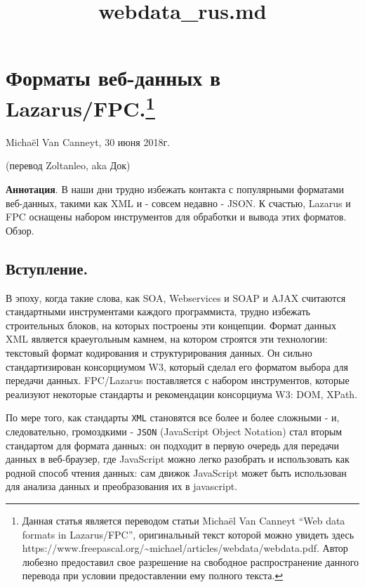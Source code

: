 \documentclass[
]{article}
\title{webdata\_rus.md}
\author{}
\date{}
\begin{document}
\maketitle

\hypertarget{header-n2623}{%
\section[Форматы веб-данных в Lazarus/FPC.]{\texorpdfstring{Форматы
веб-данных в
Lazarus/FPC.\footnote{Данная статья является переводом статьи Michaël
  Van Canneyt ``Web data formats in Lazarus/FPC'', оригинальный текст
  которой можно увидеть здесь
  https://www.freepascal.org/\textasciitilde michael/articles/webdata/webdata.pdf.
  Автор любезно предоставил свое разрешение на свободное распространение
  данного перевода при условии предоставлении ему полного текста.}}{Форматы веб-данных в Lazarus/FPC.}}\label{header-n2623}}

Michaël Van Canneyt, 30 июня 2018г.

(перевод Zoltanleo, aka Док)

\textbf{Аннотация}. В наши дни трудно избежать контакта с популярными
форматами веб-данных, такими как XML и - совсем недавно - JSON. К
счастью, Lazarus и FPC оснащены набором инструментов для обработки и
вывода этих форматов. Обзор.

\hypertarget{header-n2416}{%
\subsection{Вступление.}\label{header-n2416}}

В эпоху, когда такие слова, как SOA, Webservices и SOAP и AJAX считаются
стандартными инструментами каждого программиста, трудно избежать
строительных блоков, на которых построены эти концепции. Формат данных
XML является краеугольным камнем, на котором строятся эти технологии:
текстовый формат кодирования и структурирования данных. Он сильно
стандартизирован консорциумом W3, который сделал его форматом выбора для
передачи данных. FPC/Lazarus поставляется с набором инструментов,
которые реализуют некоторые стандарты и рекомендации консорциума W3:
DOM, XPath.

По мере того, как стандарты \texttt{XML} становятся все более и более
сложными - и, следовательно, громоздкими - \texttt{JSON} (JavaScript
Object Notation) стал вторым стандартом для формата данных: он подходит
в первую очередь для передачи данных в веб-браузер, где JavaScript можно
легко разобрать и использовать как родной способ чтения данных: сам
движок JavaScript может быть использован для анализа данных и
преобразования их в javascript.
\end{document}
